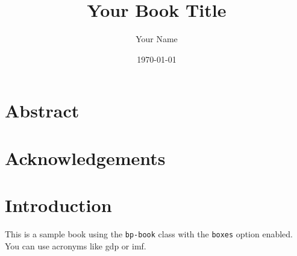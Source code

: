 \documentclass[12pt, colorlinks, glossary, boxes]{bp-book}
\title{Your Book Title}
\author{Your Name}
\date{\today}
\begin{document}

\frontmatter

\maketitle


\chapter*{Abstract}




\chapter*{Acknowledgements}




\tableofcontents
\listofcasestudies
\listoffigures
\listoftables
\printglossaries


\mainmatter


\chapter{Introduction}
\label{chap:intro}

This is a sample book using the \texttt{bp-book} class with the \texttt{boxes} option enabled.
You can use acronyms like \gls{gdp} or \gls{imf}.
\end{document}
